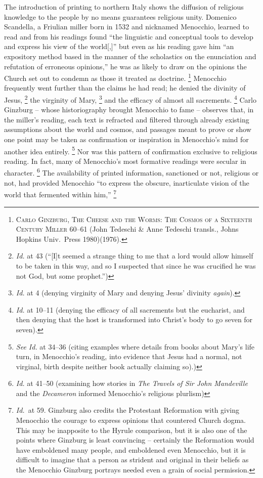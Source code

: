 \documentclass[../FGP.tex]{subfiles}
\begin{document}
The introduction of printing to northern Italy shows the diffusion of religious knowledge to the people by no means guarantees religious unity. Domenico Scandella, a Friulian miller born in 1532 and nicknamed Menocchio, learned to read and from his readings found ``the linguistic and conceptual tools to develop and express his view of the world[,]'' but even as his reading gave him ``an expository method based in the manner of the scholastics on the enunciation and refutation of erroneous opinions,'' he was as likely to draw on the opinions the Church set out to condemn as those it treated as doctrine.%
  \footnote{\textsc{Carlo Ginzburg, The Cheese and the Worms: The Cosmos of a Sixteenth Century Miller} 60--61 (John Tedeschi \& Anne Tedeschi transls., Johns Hopkins Univ.~Press 1980)(1976).}
Menocchio frequently went further than the claims he had read; he denied the divinity of Jesus,%
    \footnote{\textit{Id.} at 43 (``[I]t seemed a strange thing to me that a lord would allow himself to be taken in this way, and so I suspected that since he was crucified he was not God, but some prophet.'')}
the virginity of Mary,%
  \footnote{\textit{Id.} at 4 (denying virginity of Mary and denying Jesus' divinity \emph{again}).}
and the efficacy of almost all sacrements.%
  \footnote{\textit{Id.} at 10--11 (denying the efficacy of all sacrements but the eucharist, and then denying that the host is transformed into Christ's body to go seven for seven).}
Carlo Ginzburg -- whose historiography brought Menocchio to fame -- observes that, in the miller's reading, each text is refracted and filtered through already existing assumptions about the world and cosmos, and passages meant to prove or show one point may be taken as confirmation or inspiration in Menocchio's mind for another idea entirely.%
  \footnote{\textit{See Id.} at 34--36 (citing examples where details from books about Mary's life turn, in Menocchio's reading, into evidence that Jesus had a normal, not virginal, birth despite neither book actually claiming so).)}
Nor was this pattern of confirmation exclusive to religious reading. In fact, many of Menocchio's most formative readings were secular in character.%
  \footnote{\textit{Id.} at 41--50 (examining how stories in \emph{The Travels of Sir John Mandeville} and the \emph{Decameron} informed Menocchio's religious plurlism)} 
The availability of printed information, sanctioned or not, religious or not, had provided Menocchio ``to express the obscure, inarticulate vision of the world that fermented within him,''%
  \footnote{\textit{Id.}~at 59. Ginzburg also credits the Protestant Reformation with giving Menocchio the courage to express opinions that countered Church dogma. This may be inapposite to the Hyrule comparison, but it is also one of the points where Ginzburg is least convincing -- certainly the Reformation would have emboldened many people, and emboldened even Menocchio, but it is difficult to imagine that a person as strident and original in their beliefs as the Menocchio Ginzburg portrays needed even a grain of social permission.}
\end{document}
